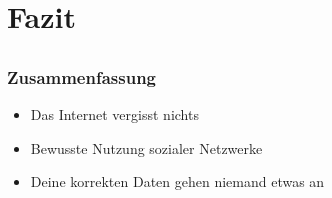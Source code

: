 \documentclass[12pt]{beamer}
\begin{document}
\section{Fazit}
\subsection{}

\begin{frame}
  \frametitle{Zusammenfassung}
  \begin{itemize}
    \item Das Internet vergisst nichts
    \item Bewusste Nutzung sozialer Netzwerke
    \item Deine korrekten Daten gehen niemand etwas an
  \end{itemize}
\end{frame}
\end{document}
